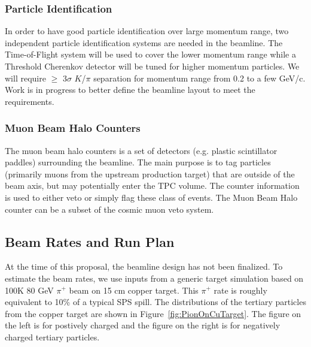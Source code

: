 \subsubsection{Particle Identification}
In order to have good particle identification over large momentum range, two independent particle identification systems are needed in the beamline. The Time-of-Flight system will be used to cover the lower momentum range while a Threshold Cherenkov detector will be tuned for higher momentum particles. We will require $\geq$ 3$\sigma$ $K$/$\pi$ separation for momentum range from 0.2 to a few GeV/c. Work is in progress to better define the beamline layout to meet the requirements.

\subsubsection{Muon Beam Halo Counters}
The muon beam halo counters is a set of detectors (e.g. plastic scintillator paddles) surrounding the beamline. The main purpose is to tag particles (primarily muons from the upstream production target) that are outside of the beam axis, but may potentially enter the TPC volume. The counter information is used to either veto or simply flag these class of events. The Muon Beam Halo counter can be a subset of the cosmic muon veto system. 



\subsection{Beam Rates and Run Plan}
At the time of this proposal, the beamline design has not been finalized. To estimate the beam rates, we use inputs from a generic target simulation based on 100K 80 GeV $\pi^+$ beam on 15 cm copper target. This $\pi^+$ rate is roughly equivalent to 10\% of a typical SPS spill. The distributions of the tertiary particles from the copper target are shown in Figure~\ref{fig:PionOnCuTarget}. The figure on the left is for postively charged and the figure on the right is for negatively charged tertiary particles. 

